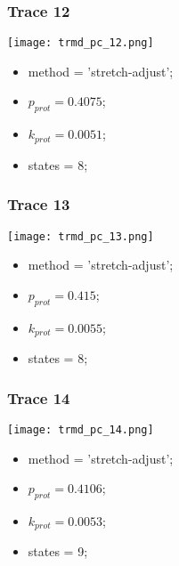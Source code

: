 \subsubsection{Trace 12}
\begin{minipage}[c]{0.7\textwidth}
	\texttt{[image: trmd\_pc\_12.png]}
\end{minipage}
\hfill
\begin{minipage}[c]{0.45\textwidth}
	\begin{itemize}
		\item method = 'stretch-adjust';
		\item $p_{prot}=0.4075$;
		\item $k_{prot}=0.0051$;
		\item states = 8;
	\end{itemize}
\end{minipage}

\subsubsection{Trace 13}
\begin{minipage}[c]{0.7\textwidth}
	\texttt{[image: trmd\_pc\_13.png]}
\end{minipage}
\hfill
\begin{minipage}[c]{0.45\textwidth}
	\begin{itemize}
		\item method = 'stretch-adjust';
		\item $p_{prot}=0.415$;
		\item $k_{prot}=0.0055$;
		\item states = 8;
	\end{itemize}
\end{minipage}

\subsubsection{Trace 14}
\begin{minipage}[c]{0.7\textwidth}
	\texttt{[image: trmd\_pc\_14.png]}
\end{minipage}
\hfill
\begin{minipage}[c]{0.45\textwidth}
	\begin{itemize}
		\item method = 'stretch-adjust';
		\item $p_{prot}=0.4106$;
		\item $k_{prot}=0.0053$;
		\item states = 9;
	\end{itemize}
\end{minipage}

